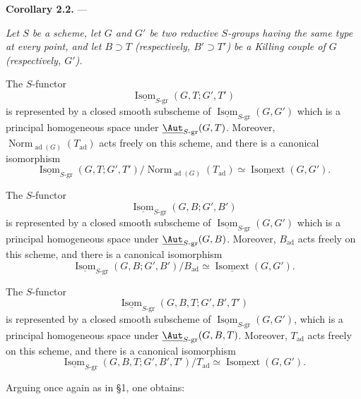 \medskip\noindent\textbf{Corollary 2.2.} ---
{\itshape Let \(S\) be a scheme, let \(G\) and \(G'\) be two reductive
\(S\)-groups having the same type at every point, and let
\(B\supset T\) (respectively, \(B'\supset T'\)) be a Killing couple
of \(G\) (respectively, \(G'\)).

\textup{} The \(S\)-functor
\[
  \underline{\operatorname{Isom}}_{S\text{-}\mathrm{gr}}
    (G,T;G',T')
\]
is represented by a closed smooth subscheme of
\(\underline{\operatorname{Isom}}_{S\text{-}\mathrm{gr}}(G,G')\)
which is a principal homogeneous space under
\(\underline{\Aut}_{S\text{-}\mathrm{gr}}(G,T)\).
Moreover,
\(\operatorname{Norm}_{\operatorname{ad}(G)}(T_{\mathrm{ad}})\)
acts freely on this scheme, and there is a canonical isomorphism
\[
  \underline{\operatorname{Isom}}_{S\text{-}\mathrm{gr}}
    (G,T;G',T')
  \big/
  \operatorname{Norm}_{\operatorname{ad}(G)}(T_{\mathrm{ad}})
  \simeq
  \underline{\operatorname{Isomext}}(G,G').
\]

\textup{} The \(S\)-functor
\[
  \underline{\operatorname{Isom}}_{S\text{-}\mathrm{gr}}
    (G,B;G',B')
\]
is represented by a closed smooth subscheme of
\(\underline{\operatorname{Isom}}_{S\text{-}\mathrm{gr}}(G,G')\)
which is a principal homogeneous space under
\(\underline{\Aut}_{S\text{-}\mathrm{gr}}(G,B)\).
Moreover, \(B_{\mathrm{ad}}\) acts freely on this scheme, and there
is a canonical isomorphism
\[
  \underline{\operatorname{Isom}}_{S\text{-}\mathrm{gr}}
    (G,B;G',B')
  \big/B_{\mathrm{ad}}
  \simeq
  \underline{\operatorname{Isomext}}(G,G').
\]

\textup{} The \(S\)-functor
\[
  \underline{\operatorname{Isom}}_{S\text{-}\mathrm{gr}}
    (G,B,T;G',B',T')
\]
is represented by a closed smooth subscheme of
\(\underline{\operatorname{Isom}}_{S\text{-}\mathrm{gr}}(G,G')\),
which is a principal homogeneous space under
\(\underline{\Aut}_{S\text{-}\mathrm{gr}}(G,B,T)\).
Moreover, \(T_{\mathrm{ad}}\) acts freely on this scheme, and there
is a canonical isomorphism
\[
  \underline{\operatorname{Isom}}_{S\text{-}\mathrm{gr}}
    (G,B,T;G',B',T')
  \big/T_{\mathrm{ad}}
  \simeq
  \underline{\operatorname{Isomext}}(G,G').
\]}

Arguing once again as in \S1, one obtains:

